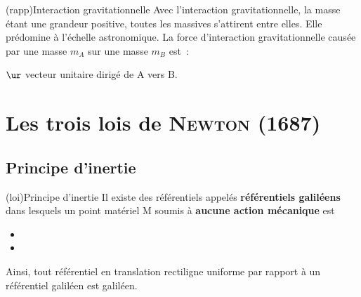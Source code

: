 \documentclass[../../main/main.tex]{subfiles}
\begin{document}
\begin{tcb}(rapp){Interaction gravitationnelle}
	Avec l'interaction gravitationnelle, la masse étant une grandeur positive,
	toutes les massives s'attirent entre elles. Elle prédomine à l'échelle
	astronomique.
	\smallbreak
	La force d'interaction gravitationnelle causée par une masse
	$m_A$ sur une masse $m_B$ est~:
	\smallbreak
	\begin{isd}
		\psw{%
			\[
				\Ff_{g,\rm A\ra B} = -\Gc \frac{m_Am_B}{\rm AB^2}\ur
				\qavec
				\ur = \frac{\vvr{AB}}{\rm AB}
			\]
		}%
		$\ur$ vecteur unitaire dirigé de A vers B.
		\tcblower
		\begin{center}
			\vspace{-15pt}
		\end{center}
	\end{isd}
\end{tcb}

\section{Les trois lois de \textsc{Newton} (1687)}
\subsection{Principe d'inertie}

\begin{tcb*}(loi){Principe d'inertie}
	Il existe des référentiels appelés \textbf{référentiels galiléens} dans
	lesquels un point matériel M soumis à \textbf{aucune action mécanique} est
	\begin{itemize}
		\item {}
		\item {}
	\end{itemize}
	Ainsi, tout référentiel en translation rectiligne uniforme par rapport à un
	référentiel galiléen est galiléen.
\end{tcb*}
\end{document}
